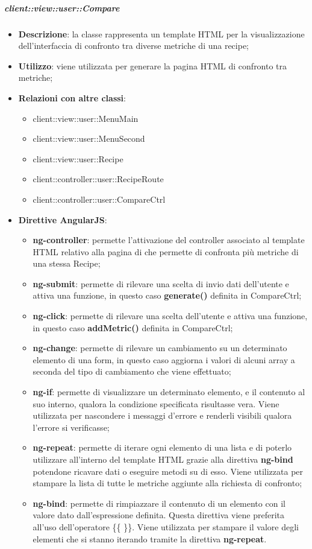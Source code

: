 		\subparagraph{client::view::user::Compare} %
		\label{subp:bdsm_app_client_view_user_compare}

			\begin{itemize}
				\item \textbf{Descrizione}: la classe rappresenta un template HTML per la visualizzazione dell'interfaccia di confronto tra diverse metriche di una recipe;
				\item \textbf{Utilizzo}: viene utilizzata per generare la pagina HTML di confronto tra metriche;
				\item \textbf{Relazioni con altre classi}:
					\begin{itemize}
						\item client::view::user::MenuMain
						\item client::view::user::MenuSecond
						\item client::view::user::Recipe
						\item client::controller::user::RecipeRoute
						\item client::controller::user::CompareCtrl
					\end{itemize}
				\item \textbf{Direttive AngularJS}:
					\begin{itemize}
						\item \textbf{ng-controller}: permette l'attivazione del controller associato al template HTML relativo alla pagina di che permette di confronta più metriche di una stessa Recipe;
						\item \textbf{ng-submit}: permette di rilevare una scelta di invio dati dell'utente e attiva una funzione, in questo caso \textbf{generate()} definita in CompareCtrl;
						\item \textbf{ng-click}: permette di rilevare una scelta dell'utente e attiva una funzione, in questo caso \textbf{addMetric()} definita in CompareCtrl;
						\item \textbf{ng-change}: permette di rilevare un cambiamento su un determinato elemento di una form, in questo caso aggiorna i valori di alcuni array a seconda del tipo di cambiamento che viene effettuato;
						\item \textbf{ng-if}: permette di visualizzare un determinato elemento, e il contenuto al suo interno, qualora la condizione specificata risultasse vera. Viene utilizzata per nascondere i messaggi d'errore e renderli visibili qualora l'errore si verificasse;
						\item \textbf{ng-repeat}: permette di iterare ogni elemento di una lista e di poterlo utilizzare all'interno del template HTML grazie alla direttiva \textbf{ng-bind} potendone ricavare dati o eseguire metodi su di esso. Viene utilizzata per stampare la lista di tutte le metriche aggiunte alla richiesta di confronto;
						\item \textbf{ng-bind}: permette di rimpiazzare il contenuto di un elemento con il valore dato dall'espressione definita. Questa direttiva viene preferita all'uso dell'operatore \{\{ \}\}. Viene utilizzata per stampare il valore degli elementi che si stanno iterando tramite la direttiva \textbf{ng-repeat}.
					\end{itemize}
			\end{itemize}
